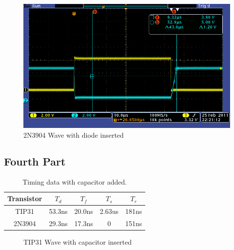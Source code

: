 \documentclass[10pt]{article}
\begin{document}
		\begin{figure}[H]
			\centering
			\includegraphics[width=4.5in]{wave_3_3904.png}
			\caption{2N3904 Wave with diode inserted}
			\label{fig:2N-3}
		\end{figure}

	\subsection{Fourth Part}
		\begin{table}[H]
			\centering
			\begin{tabular}{*{4}{c|}c}
				Transistor & $T_d$ & $T_f$ & $T_s$ & $T_r$ \\ \hline

				TIP31 & 53.3ns & 20.0ns & 2.63us & 181ns \\
				2N3904 & 29.3ns & 17.3ns & 0 & 151ns \\
			\end{tabular}
			\caption{Timing data with capacitor added.}
			\label{tbl:4}
		\end{table}
		
		\begin{figure}[H]
			\caption{TIP31 Wave with capacitor inserted}
			\label{fig:tip31-4}
		\end{figure}
\end{document}
